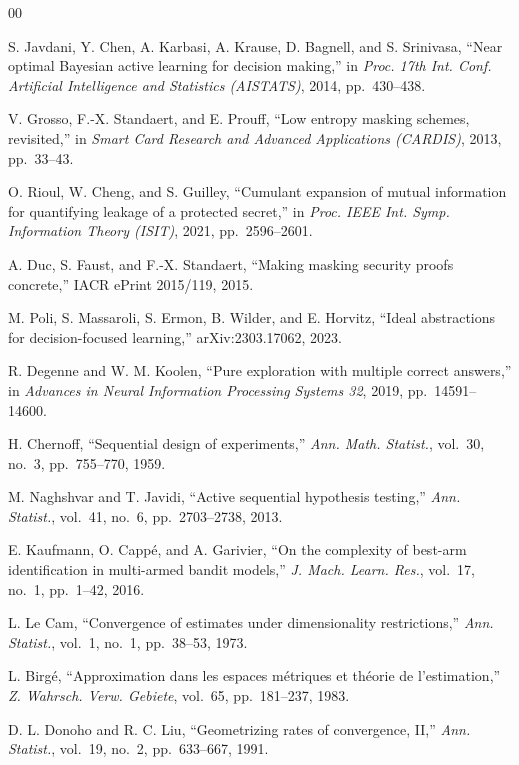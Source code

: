 \begin{thebibliography}{00}

 S. Javdani, Y. Chen, A. Karbasi, A. Krause, D. Bagnell, and
S. Srinivasa, ``Near optimal Bayesian active learning for decision making,'' in
\emph{Proc. 17th Int. Conf. Artificial Intelligence and Statistics (AISTATS)}, 2014,
pp.~430--438.

 V. Grosso, F.-X. Standaert, and E. Prouff, ``Low entropy masking
schemes, revisited,'' in \emph{Smart Card Research and Advanced Applications (CARDIS)},
2013, pp.~33--43.

 O. Rioul, W. Cheng, and S. Guilley, ``Cumulant expansion of mutual
information for quantifying leakage of a protected secret,'' in \emph{Proc. IEEE Int. Symp.
Information Theory (ISIT)}, 2021, pp.~2596--2601.

 A. Duc, S. Faust, and F.-X. Standaert, ``Making masking security
proofs concrete,'' IACR ePrint 2015/119, 2015.

 M. Poli, S. Massaroli, S. Ermon, B. Wilder, and E. Horvitz, ``Ideal
abstractions for decision-focused learning,'' arXiv:2303.17062, 2023.

 R. Degenne and W. M. Koolen, ``Pure exploration with multiple correct
answers,'' in \emph{Advances in Neural Information Processing Systems 32}, 2019,
pp.~14591--14600.

 H. Chernoff, ``Sequential design of experiments,'' \emph{Ann. Math.
Statist.}, vol.~30, no.~3, pp.~755--770, 1959.

 M. Naghshvar and T. Javidi, ``Active sequential hypothesis testing,''
\emph{Ann. Statist.}, vol.~41, no.~6, pp.~2703--2738, 2013.

 E. Kaufmann, O. Capp\'e, and A. Garivier, ``On the complexity of
best-arm identification in multi-armed bandit models,'' \emph{J. Mach. Learn. Res.}, vol.~17,
no.~1, pp.~1--42, 2016.

 L. Le Cam, ``Convergence of estimates under dimensionality restrictions,''
\emph{Ann. Statist.}, vol.~1, no.~1, pp.~38--53, 1973.

 L. Birg\'e, ``Approximation dans les espaces m\'etriques et th\'eorie de
l'estimation,'' \emph{Z. Wahrsch. Verw. Gebiete}, vol.~65, pp.~181--237, 1983.

 D. L. Donoho and R. C. Liu, ``Geometrizing rates of convergence, II,''
\emph{Ann. Statist.}, vol.~19, no.~2, pp.~633--667, 1991.


\end{thebibliography}
